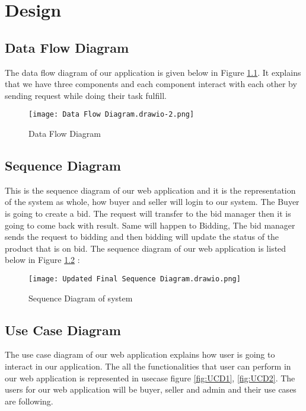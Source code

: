 \doublespacing
\chapter{Design} \label{chap:design}



\doublespacing
\section{Data Flow Diagram}
The data flow diagram of our application is given below in Figure \ref{fig:DFD}. It explains that we have three components and each component interact with each other by sending request while doing their task fulfill.
\begin{figure}[!h]
    \centering
    \texttt{[image: Data Flow Diagram.drawio-2.png]}
    \caption{Data Flow Diagram}
    
    \label{fig:DFD}
\end{figure}
\newpage
\section{Sequence Diagram}
This is the sequence diagram of our web application and it is the  representation of the system as whole, how buyer and seller will login to our system. The Buyer is going to create a bid. The request will transfer to the bid manager then it is going to come back with result. Same will happen to Bidding, The bid manager sends the request to bidding and then bidding will update the status of the product that is on bid. The sequence diagram of our web application is listed below in Figure \ref{fig:SD} : \\
\begin{figure}[!h]
    \centering
    \texttt{[image: Updated Final Sequence Diagram.drawio.png]}
    \caption{Sequence Diagram of system}
    \label{fig:SD}
\end{figure}
\section{Use Case Diagram}
The use case diagram of our web application explains how user is going to interact in our application. The all the functionalities that user can perform in our web application is represented in usecase figure \ref{fig:UCD1}, \ref{fig:UCD2}. The users for our web application will be buyer, seller and admin and their use cases are following.

